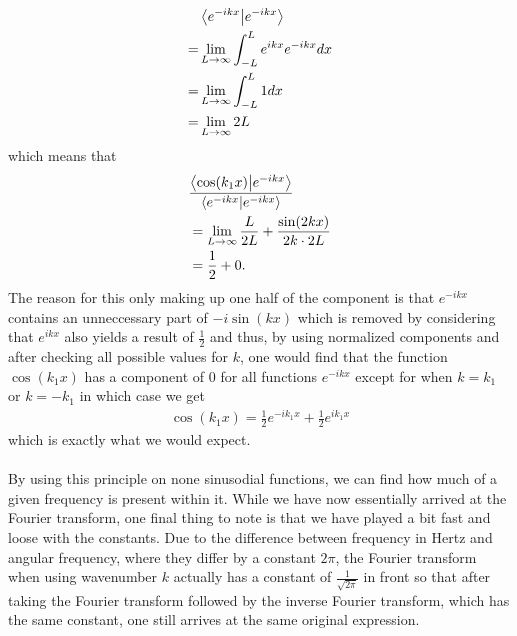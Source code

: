 \begin{align*}
    &\braket{e^{-ikx}}{e^{-ikx}}\\
    =&\lim_{L\rightarrow\infty} \int_{-L}^Le^{ikx}e^{-ikx}dx\\
    = &\lim_{L\rightarrow\infty} \int_{-L}^L 1dx\\
    = &\lim_{L\rightarrow\infty} 2L
\end{align*} which means that 
\begin{align*}
    &\frac{\braket{\cos(k_1x)}{e^{-ikx}}}{\braket{e^{-ikx}}{e^{-ikx}}}\\
    &=\lim_{L\rightarrow\infty}\frac{L}{2L}+\frac{\sin(2kx)}{2k\cdot 2L}\\
    &=\frac{1}{2}+0.
\end{align*} The reason for this only making up one half of the component is that $e^{-ikx}$ contains an unneccessary part of $-i\sin(kx)$ which is removed by considering that $e^{ikx}$ also yields a result of $\frac{1}{2}$ and thus, by using normalized components and after checking all possible values for $k$, one would find that the function $\cos(k_1x)$ has  a component of 0 for all functions $e^{-ikx}$ except for when $k=k_1$ or $k=-k_1$ in which case we get \begin{align*}
    \cos(k_1x) = \frac{1}{2}e^{-ik_1x} + \frac{1}{2}e^{ik_1x}
\end{align*} which is exactly what we would expect.\\ \\

\noindent By using this principle on none sinusodial functions, we can find how much of a given frequency is present within it. While we have now essentially arrived at the Fourier transform, one final thing to note is that we have played a bit fast and loose with the constants. Due to the difference between frequency in Hertz and angular frequency, where they differ by a constant $2\pi$, the Fourier transform when using wavenumber $k$ actually has a constant of $\frac{1}{\sqrt{2\pi}}$ in front so that after taking the Fourier transform followed by the inverse Fourier transform, which has the same constant, one still arrives at the same original expression.      



